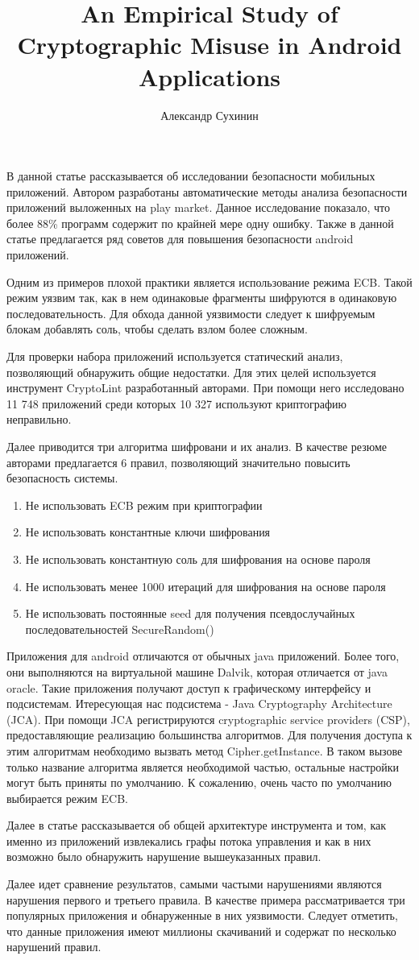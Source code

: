 \documentclass[10pt,a4paper]{article}
\author{Александр Сухинин}
\title{An Empirical Study of Cryptographic Misuse in Android Applications}
\begin{document}
\maketitle
В данной статье рассказывается об исследовании безопасности мобильных приложений. Автором разработаны автоматические методы анализа безопасности приложений выложенных на play market. Данное исследование показало, что более 88\% программ содержит по крайней мере одну ошибку. Также в данной статье предлагается ряд советов для повышения безопасности android приложений.

Одним из примеров плохой практики является использование режима ECB. Такой режим уязвим так, как в нем одинаковые фрагменты шифруются в одинаковую последовательность. Для обхода данной уязвимости следует к шифруемым блокам добавлять соль, чтобы сделать взлом более сложным.

Для проверки набора приложений используется статический анализ, позволяющий обнаружить общие недостатки. Для этих целей используется инструмент CryptoLint разработанный авторами. При помощи него исследовано 11 748 приложений среди которых 10 327 используют криптографию неправильно.

Далее приводится три алгоритма шифровани и их анализ. В качестве резюме авторами предлагается 6 правил, позволяющий значительно повысить безопасность системы.

\begin{enumerate}
\item Не использовать ECB режим при криптографии
\item Не использовать константные ключи шифрования
\item Не использовать константную соль для шифрования на основе пароля
\item Не использовать менее 1000 итераций для шифрования на основе пароля
\item Не использовать постоянные seed для получения псевдослучайных последовательностей SecureRandom()
\end{enumerate}

Приложения для android отличаются от обычных java приложений. Более того, они выполняются на виртуальной машине Dalvik, которая отличается от java oracle. Такие приложения получают доступ к графическому интерфейсу и подсистемам. Итересующая нас подсистема -  Java Cryptography Architecture (JCA). При помощи JCA регистрируются cryptographic service providers (CSP), предоставляющие реализацию большинства алгоритмов. Для получения доступа к этим алгоритмам необходимо вызвать метод Cipher.getInstance. В таком вызове только название алгоритма является необходимой частью, остальные настройки могут быть приняты по умолчанию. К сожалению, очень часто по умолчанию выбирается режим ECB.

Далее в статье рассказывается об общей архитектуре инструмента и том, как именно из приложений извлекались графы потока управления и как в них возможно было обнаружить нарушение вышеуказанных правил.

Далее идет сравнение результатов, самыми частыми нарушениями являются нарушения первого и третьего правила. В качестве примера рассматривается три популярных приложения и обнаруженные в них уязвимости. Следует отметить, что данные приложения имеют миллионы скачиваний и содержат по несколько нарушений правил. 
\end{document}
